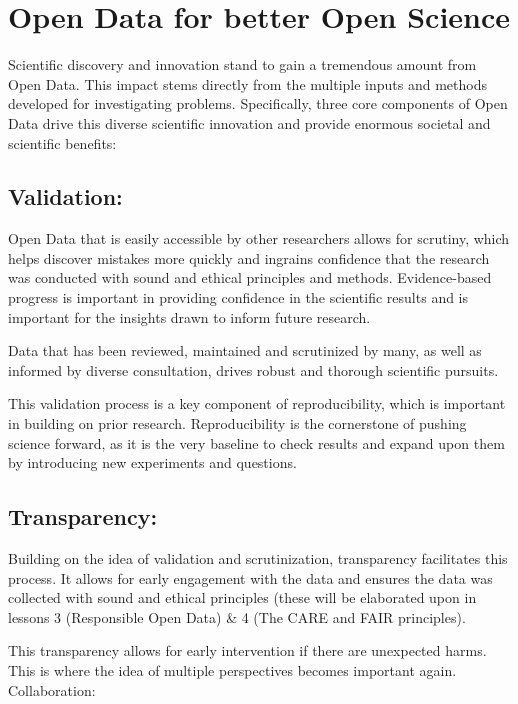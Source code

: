 \documentclass[
  letterpaper,
  DIV=11,
  numbers=noendperiod]{scrreport}
\begin{document}
\hypertarget{open-data-for-better-open-science}{%
\section{Open Data for better Open
Science}\label{open-data-for-better-open-science}}

Scientific discovery and innovation stand to gain a tremendous amount
from Open Data. This impact stems directly from the multiple inputs and
methods developed for investigating problems. Specifically, three core
components of Open Data drive this diverse scientific innovation and
provide enormous societal and scientific benefits:

\hypertarget{validation}{%
\subsection{Validation:}\label{validation}}

Open Data that is easily accessible by other researchers allows for
scrutiny, which helps discover mistakes more quickly and ingrains
confidence that the research was conducted with sound and ethical
principles and methods. Evidence-based progress is important in
providing confidence in the scientific results and is important for the
insights drawn to inform future research.

Data that has been reviewed, maintained and scrutinized by many, as well
as informed by diverse consultation, drives robust and thorough
scientific pursuits.

This validation process is a key component of reproducibility, which is
important in building on prior research. Reproducibility is the
cornerstone of pushing science forward, as it is the very baseline to
check results and expand upon them by introducing new experiments and
questions.

\hypertarget{transparency}{%
\subsection{Transparency:}\label{transparency}}

Building on the idea of validation and scrutinization, transparency
facilitates this process. It allows for early engagement with the data
and ensures the data was collected with sound and ethical principles
(these will be elaborated upon in lessons 3 (Responsible Open Data) \& 4
(The CARE and FAIR principles).

This transparency allows for early intervention if there are unexpected
harms. This is where the idea of multiple perspectives becomes important
again. Collaboration:
\end{document}
